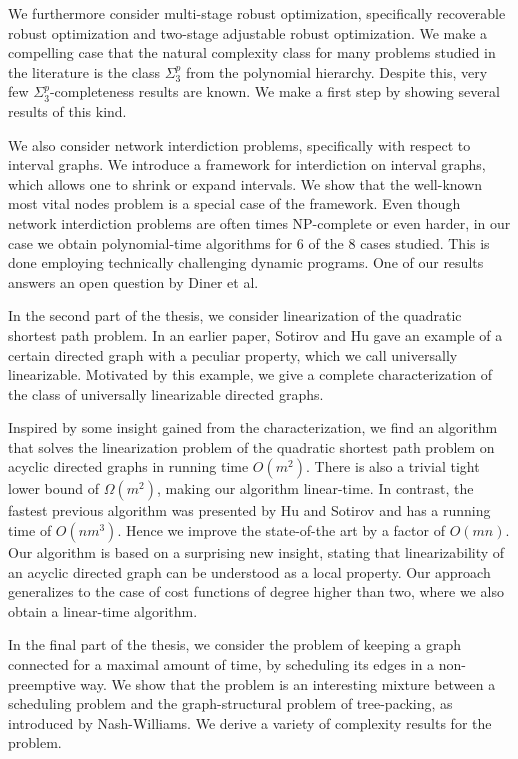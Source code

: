 \documentclass[twoside,openright,bibliography=totoc]{scrreprt}
\begin{document}
We furthermore consider multi-stage robust optimization, specifically recoverable robust optimization and two-stage adjustable robust optimization. We make a compelling case that the natural complexity class for many problems studied in the literature is the class $\Sigma^p_3$ from the polynomial hierarchy. Despite this, very few $\Sigma^p_3$-completeness results are known. We make a first step by showing several results of this kind.

We also consider network interdiction problems, specifically with respect to interval graphs. We introduce a framework for interdiction on interval graphs, which allows one to shrink or expand intervals. We show that the well-known most vital nodes problem is a special case of the framework. Even though network interdiction problems are often times NP-complete or even harder, in our case we obtain polynomial-time algorithms for 6 of the 8 cases studied. This is done employing technically challenging dynamic programs. One of our results answers an open question by Diner et al. 

In the second part of the thesis, we consider linearization of the quadratic shortest path problem. In an earlier paper, Sotirov and Hu gave an example of a certain directed graph with a peculiar property, which we call universally linearizable. Motivated by this example, we give a complete characterization of the class of universally linearizable directed graphs. 

Inspired by some insight gained from the characterization,
we find an algorithm that solves the linearization problem of the quadratic shortest path problem on acyclic directed graphs in running time $O(m^2)$. 
There is also a trivial tight lower bound of $\Omega(m^2)$, making our algorithm linear-time. 
In contrast, the fastest previous algorithm was presented by Hu and Sotirov and has a running time of $O(nm^3)$. Hence we improve the state-of-the art by a factor of $O(mn)$. Our algorithm is based on a surprising new insight, stating that linearizability of an acyclic directed graph can be understood as a local property.  Our approach generalizes to the case of cost functions of degree higher than two, where we also obtain a linear-time algorithm.

In the final part of the thesis, we consider the problem of keeping a graph connected for a maximal amount of time, by scheduling its edges in a non-preemptive way. 
We show that the problem is an interesting mixture between a scheduling problem and the graph-structural problem of tree-packing, as introduced by Nash-Williams. We derive a variety of complexity results for the problem.
\end{document}
